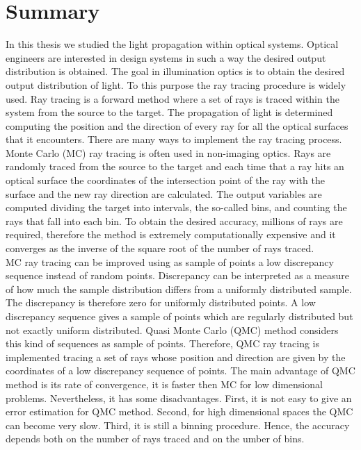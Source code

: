 \chapter*{Summary}
\pagestyle{empty}
In this thesis we studied the light propagation within optical systems.
Optical engineers are interested in design systems in such a way the desired output distribution is obtained.
The goal in illumination optics is to obtain the desired output distribution of light. To this purpose the ray tracing procedure is widely used. Ray tracing is a forward method where a set of rays is traced within the system from the source to the target. The propagation of light is determined computing the position and the direction of every ray for all the optical surfaces that it encounters. There are many ways to implement the ray tracing process. Monte Carlo (MC) ray tracing is often used in non-imaging optics. Rays are randomly traced from the source to the target and each time that a ray hits an optical surface the coordinates of the intersection point of the ray with the surface and the new ray direction are calculated. The output variables are computed dividing the target into intervals, the so-called bins, and counting the rays that fall into each bin. To obtain the desired accuracy, millions of rays are required, therefore the method is extremely computationally expensive and it converges as the inverse of the square root of the number of rays traced. 
\\ \indent 
MC ray tracing can be improved using as sample of points a low discrepancy sequence instead of random points. Discrepancy can be interpreted as a measure of how much the sample distribution differs from a uniformly distributed sample. The discrepancy is therefore zero for uniformly distributed points. A low discrepancy sequence gives a sample of points which are regularly distributed but not exactly uniform distributed. Quasi Monte Carlo (QMC) method considers this kind of sequences as sample of points. Therefore, QMC ray tracing is implemented tracing a set of rays whose position and direction are given by the coordinates of a low discrepancy sequence of points.
The main advantage of QMC method is its rate of convergence, it is faster then MC for low dimensional problems. Nevertheless, it has some disadvantages. First, it is not easy to give an error estimation for QMC method. Second, for high dimensional spaces the QMC can become very slow. Third, it is still a binning procedure. Hence, the accuracy depends both on the number of rays traced and on the umber of bins.
